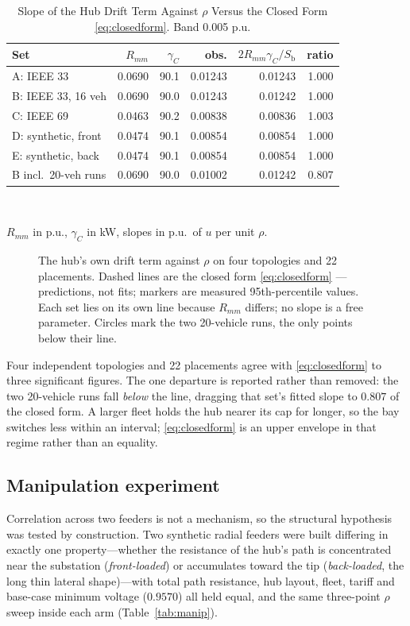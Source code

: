 \documentclass[lettersize,journal]{IEEEtran}
\newcommand{\Sb}{S_{\mathrm{b}}}
\begin{document}
\begin{table}[!t]
\renewcommand{\arraystretch}{1.15}
\caption{Slope of the Hub Drift Term Against $\rho$ Versus the Closed Form
\eqref{eq:closedform}. Band 0.005 p.u.}
\label{tab:collapse}
\centering\footnotesize\setlength{\tabcolsep}{3.4pt}
\begin{tabular}{@{}lrrrrr@{}}
\toprule
Set & $R_{mm}$ & $\gamma_C$ & obs. & $2R_{mm}\gamma_C/\Sb$ & ratio\\
\midrule
A: IEEE 33 & 0.0690 & 90.1 & 0.01243 & 0.01243 & 1.000\\
B: IEEE 33, 16 veh & 0.0690 & 90.0 & 0.01243 & 0.01242 & 1.000\\
C: IEEE 69 & 0.0463 & 90.2 & 0.00838 & 0.00836 & 1.003\\
D: synthetic, front & 0.0474 & 90.1 & 0.00854 & 0.00854 & 1.000\\
E: synthetic, back & 0.0474 & 90.1 & 0.00854 & 0.00854 & 1.000\\
\midrule
B incl.\ 20-veh runs & 0.0690 & 90.0 & 0.01002 & 0.01242 & 0.807\\
\bottomrule
\end{tabular}\\[2pt]
\raggedright\footnotesize $R_{mm}$ in p.u., $\gamma_C$ in kW, slopes in p.u.\
of $u$ per unit $\rho$.
\end{table}

\begin{figure}[!t]\centering

\caption{The hub's own drift term against $\rho$ on four topologies and 22
placements. Dashed lines are the closed form \eqref{eq:closedform}
---predictions, not fits; markers are measured 95th-percentile values. Each set
lies on its own line because $R_{mm}$ differs; no slope is a free parameter.
Circles mark the two 20-vehicle runs, the only points below their line.}
\label{fig:collapse}
\end{figure}

Four independent topologies and 22 placements agree with
\eqref{eq:closedform} to three significant figures. The one departure is
reported rather than removed: the two 20-vehicle runs fall \emph{below} the
line, dragging that set's fitted slope to $0.807$ of the closed form. A larger
fleet holds the hub nearer its cap for longer, so the bay switches less within
an interval; \eqref{eq:closedform} is an upper envelope in that regime rather
than an equality.

\subsection{Manipulation experiment}\label{sec:manip}
Correlation across two feeders is not a mechanism, so the structural hypothesis
was tested by construction. Two synthetic radial feeders were built differing
in exactly one property---whether the resistance of the hub's path is
concentrated near the substation (\emph{front-loaded}) or accumulates toward
the tip (\emph{back-loaded}, the long thin lateral shape)---with total path
resistance, hub layout, fleet, tariff and base-case minimum voltage ($0.9570$)
all held equal, and the same three-point $\rho$ sweep inside each arm
(Table~\ref{tab:manip}).
\end{document}
